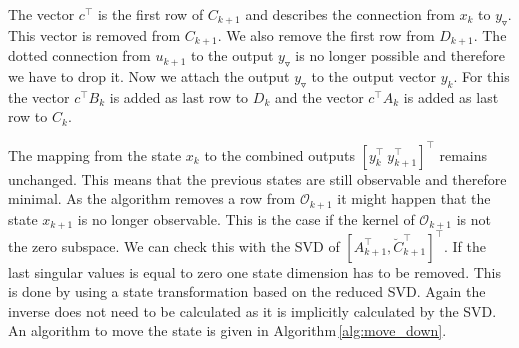\documentclass[doctype=mastersthesis,BCOR=15mm,biblatex]{ldvbook}%
\newcommand{\Ob}{\mathcal{O}} %
\newcommand{\m}{\triangledown} %
\begin{document}
The vector $c^\top$ is the first row of $C_{k+1}$ and describes the connection from $x_k$ to $y_\m$.
This vector is removed from $C_{k+1}$.
We also remove the first row from $D_{k+1}$.
The dotted connection from $u_{k+1}$ to the output $y_\m$ is no longer possible and therefore we have to drop it.
Now we attach the output $y_\m$ to the output vector $y_k$.
For this the vector $c^\top B_k$ is added as last row to $D_k$ and the vector $c^\top A_k$ is added as last row to $C_k$.

The mapping from the state $x_k$ to the combined outputs $[y_k^\top \: y_{k+1}^\top]^\top$ remains unchanged. This means that the previous states are still observable and therefore minimal. 
As the algorithm removes a row from $\Ob_{k+1}$ it might happen that the state $x_{k+1}$ is no longer observable.
This is the case if the kernel of $\Ob_{k+1}$ is not the zero subspace.
We can check this with the SVD of $[A_{k+1}^\top,\breve{C}_{k+1}^\top]^\top$.
If the last singular values is equal to zero one state dimension has to be removed.
This is done by using a state transformation based on the reduced SVD. 
Again the inverse does not need to be calculated as it is implicitly calculated by the SVD.
An algorithm to move the state is given in Algorithm\,\ref{alg:move_down}.

\FloatBarrier
\end{document}
